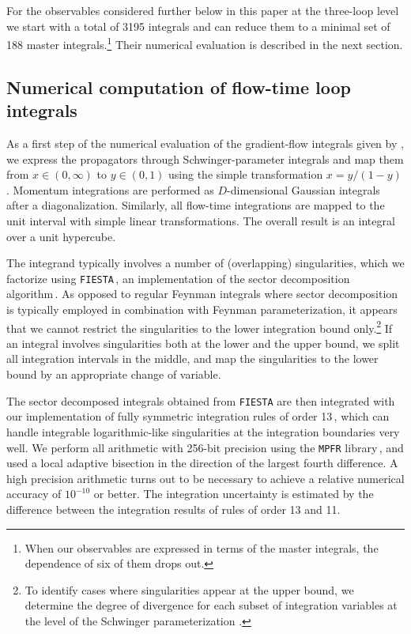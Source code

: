 For the observables considered further below in this paper at the three-loop level we start
with a total of 3195 integrals and can reduce them to a minimal set of 188 master integrals.\footnote{When our
	observables are expressed in terms of the master integrals, the dependence of six of them drops out.}
Their numerical evaluation is described in the next section.

\subsection{Numerical computation of flow-time loop integrals}

As a first step of the numerical evaluation of the gradient-flow integrals given by ,
we express the propagators through Schwinger-parameter integrals and map them from $x\in(0,\infty)$ to
$y\in(0,1)$ using the simple transformation $x=y/(1-y)$.
Momentum integrations are performed as $D$-dimensional Gaussian integrals after a diagonalization.
Similarly, all
flow-time integrations are mapped to the unit interval with simple
linear transformations. The overall result is an integral over a unit hypercube.

The integrand typically involves a number of (overlapping)
singularities, which we factorize using
\texttt{FIESTA}\,\cite{Smirnov:2013eza}, an implementation of the sector
decomposition algorithm\,\cite{Binoth:2003ak}.  As opposed to regular
Feynman integrals where sector decomposition is typically employed in
combination with Feynman parameterization, it appears that we cannot
restrict the singularities to the lower integration bound
only.\footnote{To identify cases where singularities appear at the upper
  bound, we determine the degree of divergence for each subset of
  integration variables at the level of the Schwinger parameterization
  \cite{Panzer:2014gra}.} If an integral involves singularities both at the
lower and the upper bound, we split all integration intervals in the
middle, and map the singularities to the lower bound by an appropriate
change of variable.

The sector decomposed integrals obtained from \texttt{FIESTA} are then
integrated with our implementation of fully symmetric integration rules
of order 13\,\cite{GenzMalik,Harlander:2016vzb}, which can handle
integrable logarithmic-like singularities at the integration boundaries
very well. We perform all arithmetic with 256-bit precision using the
\texttt{MPFR} library\,\cite{Fousse:2007}, and used a local adaptive
bisection in the direction of the largest fourth difference. A high
precision arithmetic turns out to be necessary to achieve a relative
numerical accuracy of $10^{-10}$ or better. The integration uncertainty
is estimated by the difference between the integration results of rules
of order 13 and 11.

